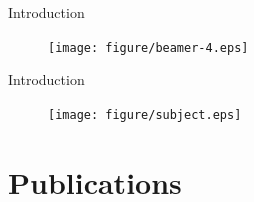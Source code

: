 \documentclass[usepdftitle=false]{beamer}
\begin{document}
\begin{frame}{Introduction}
\begin{figure}[ht]
\centering
\texttt{[image: figure/beamer-4.eps]}
\end{figure}
\end{frame}

\begin{frame}{Introduction}
\begin{figure}[ht]
\centering
\texttt{[image: figure/subject.eps]}
\label{fig:subject}
\end{figure}
\end{frame}




\section{Publications}
\end{document}
